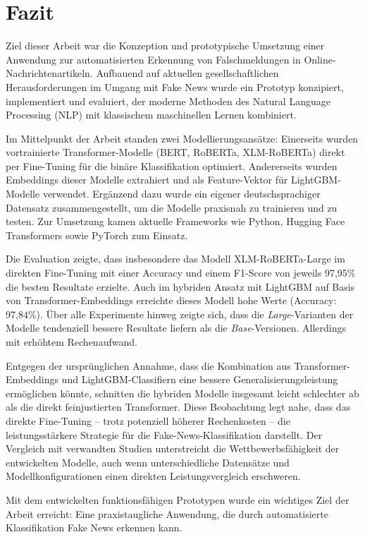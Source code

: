 \chapter{Fazit}
\label{chap:fazit}

Ziel dieser Arbeit war die Konzeption und prototypische Umsetzung einer Anwendung zur automatisierten Erkennung von Falschmeldungen in Online-Nachrichtenartikeln. 
Aufbauend auf aktuellen gesellschaftlichen Herausforderungen im Umgang mit Fake News wurde ein Prototyp konzipiert, 
implementiert und evaluiert, der moderne Methoden des Natural Language Processing (NLP) mit klassischem maschinellen Lernen kombiniert.

Im Mittelpunkt der Arbeit standen zwei Modellierungsansätze: Einerseits wurden vortrainierte Transformer-Modelle (BERT, RoBERTa, XLM-RoBERTa) 
direkt per Fine-Tuning für die binäre Klassifikation optimiert. Andererseits wurden Embeddings dieser Modelle extrahiert und als Feature-Vektor 
für LightGBM-Modelle verwendet. Ergänzend dazu wurde ein eigener deutschsprachiger Datensatz zusammengestellt, um die Modelle praxisnah zu trainieren und zu testen.
Zur Umsetzung kamen aktuelle Frameworks wie Python, Hugging Face Transformers sowie PyTorch zum Einsatz.

Die Evaluation zeigte, dass insbesondere das Modell XLM-RoBERTa-Large im direkten Fine-Tuning mit einer Accuracy und einem F1-Score von jeweils 97,95\% 
die besten Resultate erzielte. Auch im hybriden Ansatz mit LightGBM auf Basis von Transformer-Embeddings erreichte dieses Modell hohe Werte (Accuracy: 97,84\%). 
Über alle Experimente hinweg zeigte sich, dass die \textit{Large}-Varianten der Modelle tendenziell bessere Resultate liefern als die \textit{Base}-Versionen. 
Allerdings mit erhöhtem Rechenaufwand.

Entgegen der ursprünglichen Annahme, dass die Kombination aus Transformer-Embeddings und LightGBM-Classifiern eine bessere Generalisierungsleistung
ermöglichen könnte, schnitten die hybriden Modelle insgesamt leicht schlechter ab als die direkt feinjustierten Transformer. 
Diese Beobachtung legt nahe, dass das direkte Fine-Tuning – trotz potenziell höherer Rechenkosten – die leistungsstärkere Strategie für die Fake-News-Klassifikation 
darstellt. Der Vergleich mit verwandten Studien unterstreicht die Wettbewerbsfähigkeit der entwickelten Modelle, auch wenn unterschiedliche Datensätze und 
Modellkonfigurationen einen direkten Leistungsvergleich erschweren.

Mit dem entwickelten funktionsfähigen Prototypen wurde ein wichtiges Ziel der Arbeit erreicht: 
Eine praxistaugliche Anwendung, die durch automatisierte Klassifikation Fake News erkennen kann.

